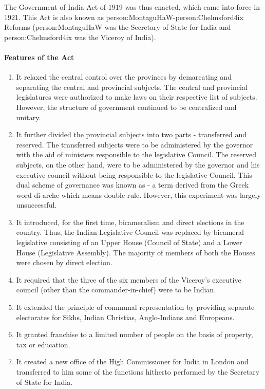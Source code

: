 The Government of India Act of 1919 was thus enacted, which came into force in 1921. This Act is also known as \gls{person:MontaguHaW}-\gls{person:Chelmsford4ix} Reforms (\gls{person:MontaguHaW} was the Secretary of State for India and \gls{person:Chelmsford4ix} was the Viceroy of India).

\paragraph{Features of the Act}
\begin{enumerate}
  \item It relaxed the central control over the provinces by demarcating and separating the central and provincial subjects. The central and provincial legislatures were authorized to make laws on their respective list of subjects. However, the structure of government continued to be
  centralized and unitary.
  \item It further divided the provincial subjects into two parts - transferred and reserved. The transferred subjects were to be administered by the governor with the aid of ministers responsible to the legislative Council. The reserved subjects, on the other hand, were to be administered by the governor and his executive council without being responsible to the legislative Council. This dual scheme of governance was known as
    - a term derived from the Greek word di-arche which means double rule. However, this experiment was largely unsuccessful.
  \item It introduced, for the first time, bicameralism and direct elections in the country. Thus, the Indian Legislative Council was replaced by bicameral legislative consisting of an Upper House (Council of State) and a Lower House (Legislative Assembly). The majority of members of both the Houses were chosen by direct election.
  \item It required that the three of the six members of the Viceroy's executive council (other than the commander-in-chief) were to be Indian.
  \item It extended the principle of communal representation by providing separate electorates for Sikhs, Indian Christias, Anglo-Indians and Europeans.
  \item It granted franchise to a limited number of people on the basis of property, tax or education.
  \item It created a new office of the High Commissioner for India in London and transferred to him some of the functions hitherto performed by the Secretary of State for India.

\end{enumerate}
